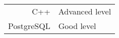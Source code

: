 
\begin{tabularx}{\textwidth}{@{}d @{ : } X@{}}
  C++ & Advanced level\\
  PostgreSQL & Good level\\
\end{tabularx}

